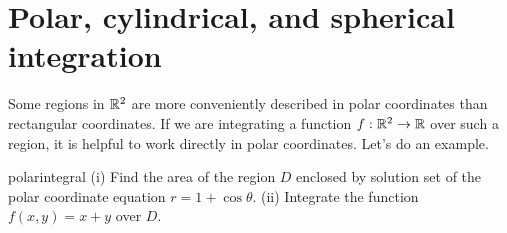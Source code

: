 \documentclass[svgnames]{watsonbook}
\begin{document}
\newpage 

\section{Polar, cylindrical, and spherical integration} \label{sec:polar_int}

Some regions in $\mathbb{R}^2$ are more conveniently described in polar
coordinates than rectangular coordinates. If we are integrating a
function $f: \mathbb{R}^2 \to \mathbb{R}$ over such a region, it is helpful to work
directly in polar coordinates. Let's do an example.

\begin{example}{}{polarintegral}
  (i) Find the area of the region $D$ enclosed by solution set of the polar
  coordinate equation $r = 1 + \cos \theta$. (ii) Integrate the
  function $f(x,y) = x + y$ over $D$. 
\end{example}
\end{document}
